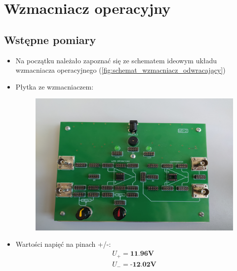 \chapter{Wzmacniacz operacyjny}


\section{Wstępne pomiary}
\begin{itemize}
    \item Na początku należało zapoznać się ze schematem ideowym układu wzmacniacza operacyjnego (\ref{fig:schemat_wzmacniacz_odwracający})
    \item Płytka ze wzmacniaczem:
        \begin{figure}[H]
            \centering
            \includegraphics[scale=0.25]{img/phone/1651502036878_scaled.png}
            \caption{}
            \label{fig:my_label}
        \end{figure}
    \item Wartości napięć na pinach +/-:
        \begin{gather}
            \label{pomiar:U+} U_+ = \textbf{11.96V} \\
            \label{pomiar:U-} U_- = \textbf{-12.02V}
        \end{gather}
    \end{itemize}

